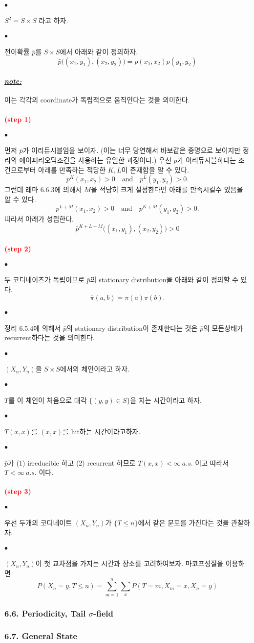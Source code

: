 \documentclass[12pt,oneside,english]{book}
\def\ck{\paragraph{\Large$\bullet$}\Large}
\def\note{\paragraph{\Large\textit{\underline{note:}}}\Large}
\newcommand{\parared}[1]{\paragraph{\Large\textcolor{red}{(#1)}}\Large}
\begin{document}
\ck $S^2=S\times S$ 라고 하자. 
\ck 전이확률 $\bar{p}$를 $S\times S$에서 아래와 같이 정의하자. 
\[
\bar{p}\big((x_1,y_1),(x_2,y_2)\big)=p(x_1,x_2)p(y_1,y_2)
\]
\note 이는 각각의 coordinate가 독립적으로 움직인다는 것을 의미한다. 
\parared{step 1} 
\ck 먼저 $\bar{p}$가 이리듀시블임을 보이자. (이는 너무 당연해서 바보같은 증명으로 보이지만 정리의 에이피리오딕조건을 사용하는 유일한 과정이다.) 우선 $p$가 이리듀시블하다는 조건으로부터 아래를 만족하는 적당한 $K,L$이 존재함을 알 수 있다. 
\[
p^K(x_1,x_2)>0 \quad \mbox {and}\quad p^L(y_1,y_2)>0.
\]
그런데 레마 6.6.3에 의해서 $M$을 적당히 크게 설정한다면 아래를 만족시킬수 있음을 알 수 있다. 
\[
p^{L+M}(x_1,x_2)>0 \quad \mbox {and}\quad p^{K+M}(y_1,y_2)>0.
\]
따라서 아래가 성립한다. 
\[
\bar{p}^{K+L+M}\big((x_1,y_1),(x_2,y_2) \big)>0
\]

\parared{step 2} 
\ck 두 코디네이츠가 독립이므로 ${\bar p}$의 stationary distribution을 아래와 같이 정의할 수 있다. 
\[
\bar{\pi}(a,b)=\pi(a)\pi(b).
\]

\ck 정리 6.5.4에 의해서 $\bar{p}$의 stationary distribution이 존재한다는 것은 $\bar{p}$의 모든상태가 recurrent하다는 것을 의미한다. 

\ck $(X_n,Y_n)$을 $S \times S$에서의 체인이라고 하자. 

\ck $T$를 이 체인이 처음으로 대각 $\{(y,y)\in S\}$을 치는 시간이라고 하자. 

\ck $T(x,x)$를 $(x,x)$를 hit하는 시간이라고하자. 

\ck $\bar{p}$가 (1) irreducible 하고 (2) recurrent 하므로 $T(x,x)<\infty ~ a.s.$ 이고 따라서 $T <\infty ~ a.s.$ 이다. 

\parared{step 3} 

\ck 우선 두개의 코디네이트 $(X_n,Y_n)$가 $\{T\leq n\}$에서 같은 분포를 가진다는 것을 관찰하자. 

\ck $(X_n,Y_n)$이 첫 교차점을 가지는 시간과 장소를 고려하여보자. 마코프성질을 이용하면 
\[
P(X_n=y,T\leq n)= \sum_{m=1}^{n}\sum_xP(T=m,X_m=x,X_n=y)
\]


\subsubsection{6.6. Periodicity, Tail $\sigma$-field}

\subsubsection{6.7. General State}
\end{document}
